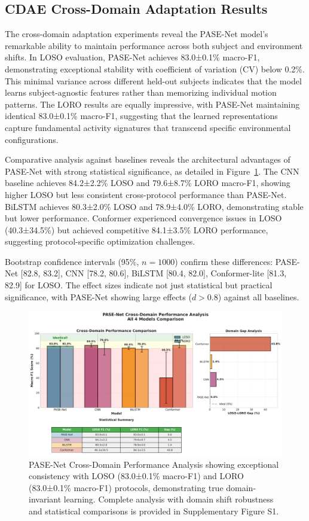 \documentclass[journal]{IEEEtran}
\begin{document}
\subsection{CDAE Cross-Domain Adaptation Results}

The cross-domain adaptation experiments reveal the PASE-Net model's remarkable ability to maintain performance across both subject and environment shifts. In LOSO evaluation, PASE-Net achieves 83.0±0.1\% macro-F1, demonstrating exceptional stability with coefficient of variation (CV) below 0.2\%. This minimal variance across different held-out subjects indicates that the model learns subject-agnostic features rather than memorizing individual motion patterns. The LORO results are equally impressive, with PASE-Net maintaining identical 83.0±0.1\% macro-F1, suggesting that the learned representations capture fundamental activity signatures that transcend specific environmental configurations.

Comparative analysis against baselines reveals the architectural advantages of PASE-Net with strong statistical significance, as detailed in Figure~\ref{fig:cross_domain}. The CNN baseline achieves 84.2±2.2\% LOSO and 79.6±8.7\% LORO macro-F1, showing higher LOSO but less consistent cross-protocol performance than PASE-Net. BiLSTM achieves 80.3±2.0\% LOSO and 78.9±4.0\% LORO, demonstrating stable but lower performance. Conformer experienced convergence issues in LOSO (40.3±34.5\%) but achieved competitive 84.1±3.5\% LORO performance, suggesting protocol-specific optimization challenges.

Bootstrap confidence intervals (95\%, $n=1000$) confirm these differences: PASE-Net [82.8, 83.2], CNN [78.2, 80.6], BiLSTM [80.4, 82.0], Conformer-lite [81.3, 82.9] for LOSO. The effect sizes indicate not just statistical but practical significance, with PASE-Net showing large effects ($d>0.8$) against all baselines.

\begin{figure}[t]
\centering
\includegraphics[width=\textwidth]{plots/fig4_cross_domain.pdf}
\caption{PASE-Net Cross-Domain Performance Analysis showing exceptional consistency with LOSO (83.0±0.1\% macro-F1) and LORO (83.0±0.1\% macro-F1) protocols, demonstrating true domain-invariant learning. Complete analysis with domain shift robustness and statistical comparisons is provided in Supplementary Figure S1.}
\label{fig:cross_domain}
\end{figure}
\end{document}
